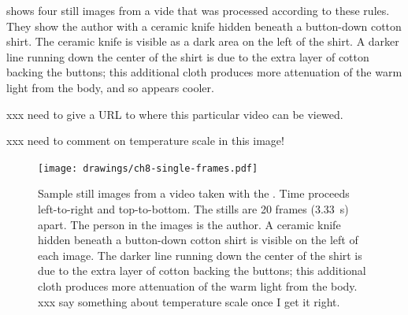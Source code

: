  shows four still images from a vide that was processed according to these rules.
They show the author with a ceramic knife hidden beneath a button-down cotton shirt.
The ceramic knife is visible as a dark area on the left of the shirt.
A darker line running down the center of the shirt is due to the extra layer of cotton backing the buttons; this additional cloth produces more attenuation of the warm light from the body, and so appears cooler.

xxx need to give a URL to where this particular video can be viewed.

xxx need to comment on temperature scale in this image!

\begin{figure}[th]
\centering
\texttt{[image: drawings/ch8-single-frames.pdf]}
\caption{
Sample still images from a video taken with the \Imager.
Time proceeds left-to-right and top-to-bottom.
The stills are 20 frames (\SI{3.33}{\s}) apart.
The person in the images is the author.
A ceramic knife hidden beneath a button-down cotton shirt is visible on the left of each image.
The darker line running down the center of the shirt is due to the extra layer of cotton backing the buttons; this additional cloth produces more attenuation of the warm light from the body.
xxx say something about temperature scale once I get it right.}
\label{fig:ch8-single-frames}
\end{figure}

